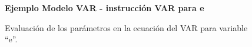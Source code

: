 	
	\begin{figure}[H]
		\centering
		\textbf{Ejemplo Modelo VAR - instrucci\'on VAR para e}\par\medskip
		\caption{Evaluación de los parámetros en la ecuación del VAR para variable \textquotedblleft e\textquotedblright.}\label{figd24}
	\end{figure}
	
	
